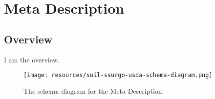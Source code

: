 
\section{Meta Description}
\label{sec:meta-description}
\subsection{Overview}
\label{ssec:overview}

I am the overview.

\begin{figure}[h!]
  \begin{center}
    \texttt{[image: resources/soil-ssurgo-usda-schema-diagram.png]}
  \end{center}
  \caption{The schema diagram for the Meta Description.}
  \label{fig:ov-diagram}
\end{figure}


